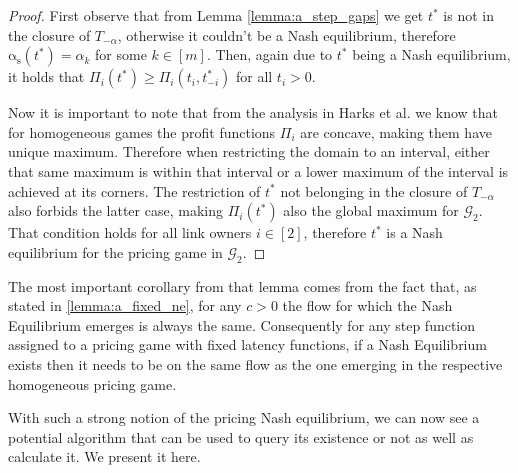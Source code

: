 \documentclass[10pt,a4paper]{book}
\newcommand{\as}{\mathrm{\alpha_s}}
\newcommand{\Gm}{\mathcal{G}}
\theoremstyle{definition}
\theoremstyle{comment}
\begin{document}
\begin{proof}
	First observe that from Lemma \ref{lemma:a_step_gaps} we get $t^*$ is not in the closure of $T_{-\alpha}$, otherwise it couldn't be a Nash equilibrium, therefore $\as(t^*) = \alpha_k$ for some $k \in [m]$.
	Then, again due to $t^*$ being a Nash equilibrium, it holds that $\Pi_i(t^*) \ge \Pi_i(t_i, t_{-i}^*)$ for all $t_i > 0$.

	Now it is important to note that from the analysis in Harks et al. \cite{Harks_2019} we know that for homogeneous games the profit functions $\Pi_i$ are concave, making them have unique maximum.
	Therefore when restricting the domain to an interval, either that same maximum is within that interval or a lower maximum of the interval is achieved at its corners.
	The restriction of $t^*$ not belonging in the closure of $T_{-\alpha}$ also forbids the latter case, making $\Pi_i(t^*)$ also the global maximum for $\Gm_2$.
	That condition holds for all link owners $i \in [2]$, therefore $t^*$ is a Nash equilibrium for the pricing game in $\Gm_2$.
\end{proof}

The most important corollary from that lemma comes from the fact that, as stated in \ref{lemma:a_fixed_ne}, for any $c > 0$ the flow for which the Nash Equilibrium emerges is always the same.
Consequently for any step function assigned to a pricing game with fixed latency functions, if a Nash Equilibrium exists then it needs to be on the same flow as the one emerging in the respective homogeneous pricing game.

With such a strong notion of the pricing Nash equilibrium, we can now see a potential algorithm that can be used to query its existence or not as well as calculate it.
We present it here.
\end{document}
